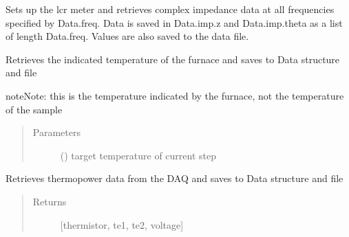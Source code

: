 \documentclass[letterpaper,10pt,english]{sphinxmanual}
\begin{document}
\begin{fulllineitems}
\begin{fulllineitems}
\end{fulllineitems}


\begin{fulllineitems}
\label{\detokenize{source/laboratory:laboratory.setup.Setup.get_impedance}}
Sets up the lcr meter and retrieves complex impedance data at all frequencies specified by Data.freq. Data is saved in Data.imp.z and Data.imp.theta as a list of length Data.freq. Values are also saved to the data file.

\end{fulllineitems}


\begin{fulllineitems}
\label{\detokenize{source/laboratory:laboratory.setup.Setup.get_temp}}
Retrieves the indicated temperature of the furnace and saves to Data structure and file

\begin{sphinxadmonition}{note}{Note:}
this is the temperature indicated by the furnace, not the temperature of the sample
\end{sphinxadmonition}
\begin{quote}\begin{description}
\item[{Parameters}] \leavevmode
{} () \textendash{} target temperature of current step

\end{description}\end{quote}

\end{fulllineitems}


\begin{fulllineitems}
\label{\detokenize{source/laboratory:laboratory.setup.Setup.get_thermopower}}
Retrieves thermopower data from the DAQ and saves to Data structure and file
\begin{quote}\begin{description}
\item[{Returns}] \leavevmode
{[}thermistor, te1, te2, voltage{]}


\end{description}
\end{quote}
\end{fulllineitems}
\end{fulllineitems}
\end{document}
